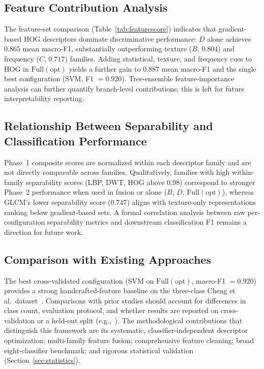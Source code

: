 \subsection{Feature Contribution Analysis}

The feature-set comparison (Table~\ref{tab:featurescore}) indicates that
gradient-based HOG descriptors dominate discriminative performance: $D$ alone
achieves $0.865$ mean macro-F1, substantially outperforming texture ($B$,
$0.804$) and frequency ($C$, $0.717$) families. Adding statistical, texture,
and frequency cues to HOG in $\mathrm{Full(opt)}$ yields a further gain to
$0.887$ mean macro-F1 and the single best configuration (SVM, F1 $=0.920$).
Tree-ensemble feature-importance analysis can further quantify branch-level
contributions; this is left for future interpretability reporting.

\subsection{Relationship Between Separability and Classification Performance}

Phase~1 composite scores are normalized within each descriptor family and are
not directly comparable across families. Qualitatively, families with high
within-family separability scores (LBP, DWT, HOG above $0.98$) correspond to
stronger Phase~2 performance when used in fusion or alone ($B$, $D$,
$\mathrm{Full(opt)}$), whereas GLCM's lower separability score ($0.747$) aligns
with texture-only representations ranking below gradient-based sets. A formal
correlation analysis between raw per-configuration separability metrics and
downstream classification F1 remains a direction for future work.

\subsection{Comparison with Existing Approaches}

The best cross-validated configuration (SVM on $\mathrm{Full(opt)}$, macro-F1
$=0.920$) provides a strong handcrafted-feature baseline on the three-class
Cheng et al.\ dataset~\cite{cheng2017}. Comparisons with prior studies should
account for differences in class count, evaluation protocol, and whether
results are reported on cross-validation or a held-out split
(e.g.,~\cite{pattanaik2022,dheepak2024,nawaz2022,basthikodi2024}). The
methodological contributions that distinguish this framework are its systematic,
classifier-independent descriptor optimization; multi-family feature fusion;
comprehensive feature cleaning; broad eight-classifier benchmark; and rigorous
statistical validation (Section~\ref{sec:statistics}).

